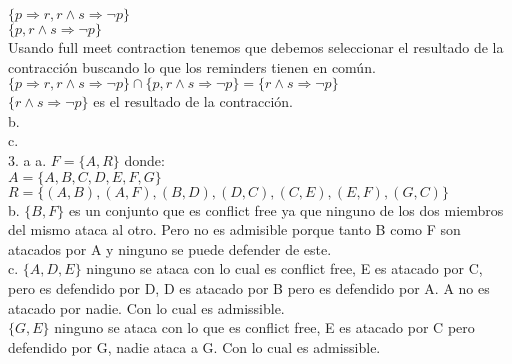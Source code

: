 $\{p \Longrightarrow  r , r \land s  \Longrightarrow \neg p \}$ \\
	
$\{p, r \land s  \Longrightarrow \neg p \}$ \\

Usando full meet contraction tenemos que debemos seleccionar el resultado de la contracción buscando lo que los reminders tienen en común. \\

$\{p \Longrightarrow  r , r \land s  \Longrightarrow \neg p \} \cap \{p, r \land s  \Longrightarrow \neg p \} = \{r \land s  \Longrightarrow \neg p\}$ \\

$\{r \land s  \Longrightarrow \neg p\}$ es el resultado de la contracción. \\

b.\\

c.\\

3. a
a. $F=\{A, R\}$ donde: \\
$A=\{A, B, C, D, E, F, G\}$ \\
$R=\{(A, B), (A, F), (B, D), (D, C), (C, E), (E, F), (G, C)\}$ \\

b. $\{B, F\}$ es un conjunto que es conflict free ya que ninguno de los dos miembros del mismo ataca al otro. Pero no es admisible porque tanto B como F son atacados por A y ninguno se puede defender de este.\\

c. $\{A, D, E\}$ ninguno se ataca con lo cual es conflict free, E es atacado por C, pero es defendido por D, D es atacado por B pero es defendido por A. A no es atacado por nadie. Con lo cual es admissible. \\

$\{G, E\}$ ninguno se ataca con lo que es conflict free, E es atacado por C pero defendido por G, nadie ataca a G. Con lo cual es admissible.

\bigskip